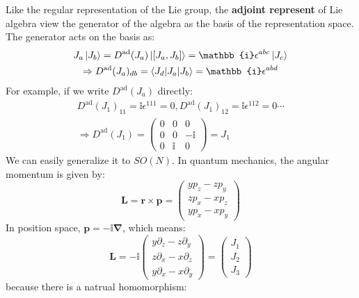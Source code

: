 \documentclass{article}
\begin{document}
	Like the regular representation of the Lie group, the \textbf{adjoint represent} of Lie algebra view the generator of the algebra as the basis of the representation space. The generator acts on the basis as:
	\begin{gather*}
		J_{a}\ket{J_{b}} =D^{\mathrm{ad}}( J_{a})\ket{[ J_{a} ,J_{b}]} =\mathbb{i} \epsilon ^{abc}\ket{J_{c}}\\
		\Rightarrow D^{\mathrm{ad}}( J_{a})_{db} =\mel**{J_{d}}{J_{a}}{J_{b}} =\mathbb{i} \epsilon ^{abd}
	\end{gather*}
	For example, if we write $D^{\mathrm{ad}}( J_{a})$ directly:
	\begin{gather*}
		D^{\mathrm{ad}}( J_{1})_{11} =\mathbb{i} \epsilon ^{111} =0,D^{\mathrm{ad}}( J_{1})_{12} =\mathbb{i} \epsilon ^{112} =0\cdots \\
		\Rightarrow D^{\mathrm{ad}}( J_{1}) =\begin{pmatrix}
			0 & 0 & 0\\
			0 & 0 & -\mathbb{i}\\
			0 & \mathbb{i} & 0
		\end{pmatrix} =J_{1}
	\end{gather*}
	We can easily generalize it to $SO( N)$. In quantum mechanics, the angular momentum is given by:
	\begin{equation*}
		\mathbf{L} =\mathbf{r} \times \mathbf{p} =\begin{pmatrix}
			yp_{z} -zp_{y}\\
			zp_{x} -xp_{z}\\
			yp_{x} -xp_{y}
		\end{pmatrix}
	\end{equation*}
	In position space, $\mathbf{p} =-\mathbb{i}\mathbf{\nabla }$, which means:
	\begin{equation*}
		\mathbf{L} =-\mathbb{i}\begin{pmatrix}
			y\partial _{z} -z\partial _{y}\\
			z\partial _{x} -x\partial _{z}\\
			y\partial _{x} -x\partial _{y}
		\end{pmatrix} =\begin{pmatrix}
			J_{1}\\
			J_{2}\\
			J_{3}
		\end{pmatrix}
	\end{equation*}
	because there is a natrual homomorphism:
\end{document}
